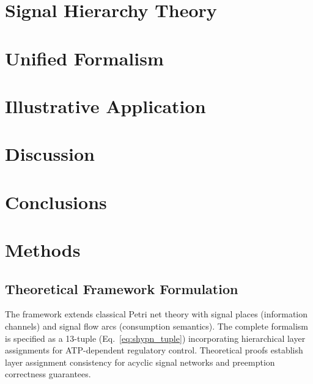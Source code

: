 \documentclass[10pt,letterpaper]{article}
\begin{document}
\section{Signal Hierarchy Theory}



\section{Unified Formalism}



\section{Illustrative Application}
\label{sec:results}



\section{Discussion}
\label{sec:discussion}



\section{Conclusions}



\section{Methods}
\label{sec:methods}

\subsection{Theoretical Framework Formulation}

The framework extends classical Petri net theory with signal places (information channels) and signal flow arcs (consumption semantics). The complete formalism is specified as a 13-tuple (Eq.~\ref{eq:shypn_tuple}) incorporating hierarchical layer assignments for ATP-dependent regulatory control. Theoretical proofs establish layer assignment consistency for acyclic signal networks and preemption correctness guarantees.
\end{document}
